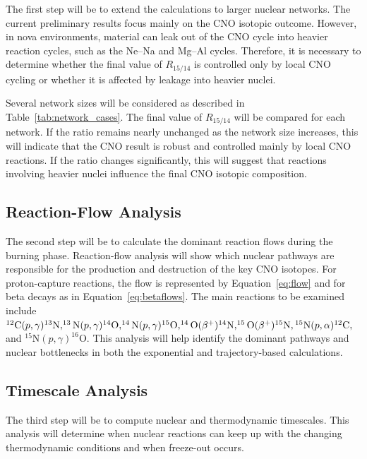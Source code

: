 The first step will be to extend the calculations to larger nuclear networks. The current preliminary results focus mainly on the CNO isotopic outcome. However, in nova environments, material can leak out of the CNO cycle into heavier reaction cycles, such as the Ne--Na and Mg--Al cycles. Therefore, it is necessary to determine whether the final value of $R_{15/14}$ is controlled only by local CNO cycling or whether it is affected by leakage into heavier nuclei.

Several network sizes will be considered as described in Table~\ref{tab:network_cases}. The final value of $R_{15/14}$ will be compared for each network. If the ratio remains nearly unchanged as the network size increases, this will indicate that the CNO result is robust and controlled mainly by local CNO reactions. If the ratio changes significantly, this will suggest that reactions involving heavier nuclei influence the final CNO isotopic composition.



\subsection{Reaction-Flow Analysis}

The second step will be to calculate the dominant reaction flows during the burning phase. Reaction-flow analysis will show which nuclear pathways are responsible for the production and destruction of the key CNO isotopes. For proton-capture reactions, the flow is represented by Equation~\ref{eq:flow} and for beta decays as in Equation~\ref{eq:betaflows}. The main reactions to be examined include $^{12}\mathrm{C}(p,\gamma)^{13}\mathrm{N}, ^{13}\mathrm{N}(p,\gamma)^{14}\mathrm{O}, ^{14}\mathrm{N}(p,\gamma)^{15}\mathrm{O}, ^{14}\mathrm{O}(\beta^+)^{14}\mathrm{N}, ^{15}\mathrm{O}(\beta^+)^{15}\mathrm{N}, \\ ^{15}\mathrm{N}  (p,\alpha)^{12}\mathrm{C}, $ and $^{15}\mathrm{N}(p,\gamma)^{16}\mathrm{O}. $
This analysis will help identify the dominant pathways and nuclear bottlenecks in both the exponential and trajectory-based calculations.

\subsection{Timescale Analysis}

The third step will be to compute nuclear and thermodynamic timescales. This analysis will determine when nuclear reactions can keep up with the changing thermodynamic conditions and when freeze-out occurs.

